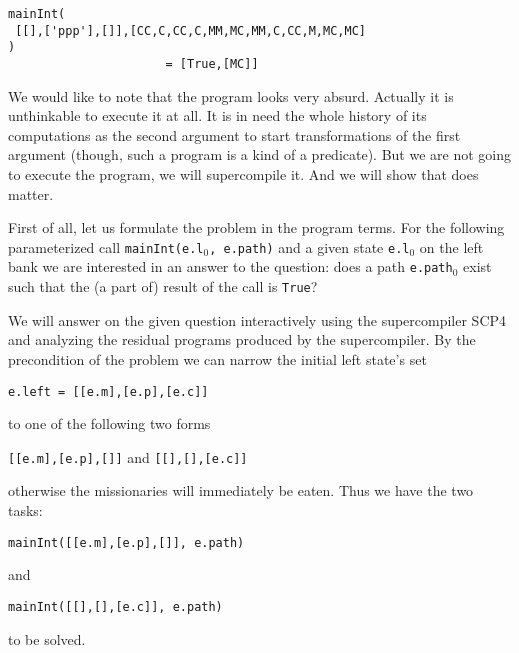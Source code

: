 \documentclass[preprint]{sigplanconf}
\begin{document}
\noindent
\begin{verbatim}
mainInt(
 [[],['ppp'],[]],[CC,C,CC,C,MM,MC,MM,C,CC,M,MC,MC]
) 
                      = [True,[MC]]
\end{verbatim}

We would like to note that the program looks very absurd. Actually it is unthinkable to execute it at all. It is in need the whole history of its computations as the second argument to start transformations of the first argument
(though, such a program is a kind of a predicate).  
But we are not going to execute the program, we will supercompile it. And we will show that does matter. 

First of all, let us formulate the problem in the program terms. For the following parameterized call \texttt{mainInt(e.l$_0$, e.path)} and a given state \texttt{e.l$_0$} on the left bank we are interested in an answer to the question: does a path \texttt{e.path$_0$} exist such that the (a part of) result of the call is \texttt{True}?  

We will answer on the given question interactively using the supercompiler SCP4 and analyzing the residual programs produced by the supercompiler.  By the precondition of the problem we can narrow the initial left state's set 
\begin{center}
\texttt{e.left = [[e.m],[e.p],[e.c]]}
\end{center} 
to one of the following two forms  
\begin{center}
\texttt{[[e.m],[e.p],[]]} and \texttt{[[],[],[e.c]]}
\end{center}
otherwise the missionaries will immediately be eaten. Thus we have the two tasks: 
\begin{center}
\texttt{mainInt([[e.m],[e.p],[]], e.path)} 
\end{center}
and 
\begin{center}
\texttt{mainInt([[],[],[e.c]], e.path)} 
\end{center}
to be solved. 
\end{document}
